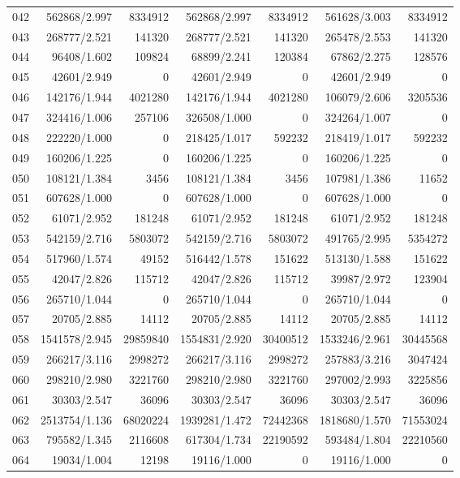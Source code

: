 \begin{longtable}{crrrrrr}
042 & 562868/2.997 & 8334912 & 562868/2.997 & 8334912 & 561628/3.003 & 8334912 \\
043 & 268777/2.521 & 141320 & 268777/2.521 & 141320 & 265478/2.553 & 141320 \\
044 & 96408/1.602 & 109824 & 68899/2.241 & 120384 & 67862/2.275 & 128576 \\
045 & 42601/2.949 & 0 & 42601/2.949 & 0 & 42601/2.949 & 0 \\
046 & 142176/1.944 & 4021280 & 142176/1.944 & 4021280 & 106079/2.606 & 3205536 \\
047 & 324416/1.006 & 257106 & 326508/1.000 & 0 & 324264/1.007 & 0 \\
048 & 222220/1.000 & 0 & 218425/1.017 & 592232 & 218419/1.017 & 592232 \\
049 & 160206/1.225 & 0 & 160206/1.225 & 0 & 160206/1.225 & 0 \\
050 & 108121/1.384 & 3456 & 108121/1.384 & 3456 & 107981/1.386 & 11652 \\
051 & 607628/1.000 & 0 & 607628/1.000 & 0 & 607628/1.000 & 0 \\
052 & 61071/2.952 & 181248 & 61071/2.952 & 181248 & 61071/2.952 & 181248 \\
053 & 542159/2.716 & 5803072 & 542159/2.716 & 5803072 & 491765/2.995 & 5354272 \\
054 & 517960/1.574 & 49152 & 516442/1.578 & 151622 & 513130/1.588 & 151622 \\
055 & 42047/2.826 & 115712 & 42047/2.826 & 115712 & 39987/2.972 & 123904 \\
056 & 265710/1.044 & 0 & 265710/1.044 & 0 & 265710/1.044 & 0 \\
057 & 20705/2.885 & 14112 & 20705/2.885 & 14112 & 20705/2.885 & 14112 \\
058 & 1541578/2.945 & 29859840 & 1554831/2.920 & 30400512 & 1533246/2.961 & 30445568 \\
059 & 266217/3.116 & 2998272 & 266217/3.116 & 2998272 & 257883/3.216 & 3047424 \\
060 & 298210/2.980 & 3221760 & 298210/2.980 & 3221760 & 297002/2.993 & 3225856 \\
061 & 30303/2.547 & 36096 & 30303/2.547 & 36096 & 30303/2.547 & 36096 \\
062 & 2513754/1.136 & 68020224 & 1939281/1.472 & 72442368 & 1818680/1.570 & 71553024 \\
063 & 795582/1.345 & 2116608 & 617304/1.734 & 22190592 & 593484/1.804 & 22210560 \\
064 & 19034/1.004 & 12198 & 19116/1.000 & 0 & 19116/1.000 & 0 \\

\end{longtable}
